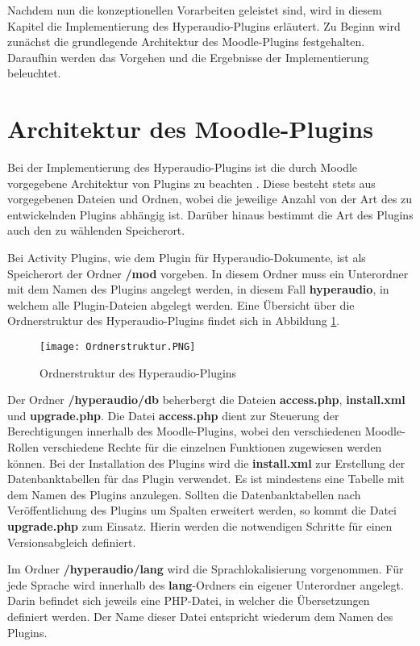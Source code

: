 Nachdem nun die konzeptionellen Vorarbeiten geleistet sind, wird in diesem Kapitel die Implementierung des Hyperaudio-Plugins erläutert. Zu Beginn wird zunächst die grundlegende Architektur des Moodle-Plugins festgehalten. Daraufhin werden das Vorgehen und die Ergebnisse der Implementierung beleuchtet.

\section{Architektur des Moodle-Plugins}
\label{sec:architektur}
Bei der Implementierung des Hyperaudio-Plugins ist die durch Moodle vorgegebene Architektur von Plugins zu beachten \citep{moodle2016activity}. Diese besteht stets aus vorgegebenen Dateien und Ordnen, wobei die jeweilige Anzahl von der Art des zu entwickelnden Plugins abhängig ist. Darüber hinaus bestimmt die Art des Plugins auch den zu wählenden Speicherort.

Bei Activity Plugins, wie dem Plugin für Hyperaudio-Dokumente, ist als Speicherort der Ordner \textbf{/mod} vorgeben. In diesem Ordner muss ein Unterordner mit dem Namen des Plugins angelegt werden, in diesem Fall \textbf{hyperaudio}, in welchem alle Plugin-Dateien abgelegt werden. Eine Übersicht über die Ordnerstruktur des Hyperaudio-Plugins findet sich in Abbildung \ref{fig:Ordnerstruktur}.

\begin{figure}[h!]
\texttt{[image: Ordnerstruktur.PNG]}
\caption{\label{fig:Ordnerstruktur}Ordnerstruktur des Hyperaudio-Plugins}
\end{figure}


Der Ordner \textbf{/hyperaudio/db} beherbergt die Dateien \textbf{access.php}, \textbf{install.xml} und \textbf{upgrade.php}. Die Datei \textbf{access.php} dient zur Steuerung der Berechtigungen innerhalb des Moodle-Plugins, wobei den verschiedenen Moodle-Rollen verschiedene Rechte für die einzelnen Funktionen zugewiesen werden können. Bei der Installation des Plugins wird die \textbf{install.xml} zur Erstellung der Datenbanktabellen für das Plugin verwendet. Es ist mindestens eine Tabelle mit dem Namen des Plugins anzulegen. Sollten die Datenbanktabellen nach Veröffentlichung des Plugins um Spalten erweitert werden, so kommt die Datei \textbf{upgrade.php} zum Einsatz. Hierin werden die notwendigen Schritte für einen Versionsabgleich definiert.

Im Ordner \textbf{/hyperaudio/lang} wird die Sprachlokalisierung vorgenommen. Für jede Sprache wird innerhalb des \textbf{lang}-Ordners ein eigener Unterordner angelegt. Darin befindet sich jeweils eine PHP-Datei, in welcher die Übersetzungen definiert werden. Der Name dieser Datei entspricht wiederum dem Namen des Plugins.

